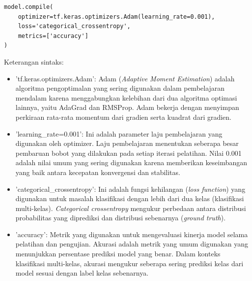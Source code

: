 \begin{lstlisting}[style=customc]
model.compile(
    optimizer=tf.keras.optimizers.Adam(learning_rate=0.001),
    loss='categorical_crossentropy',
    metrics=['accuracy']
)
\end{lstlisting}

Keterangan sintaks:
\begin{itemize}
    \item 'tf.keras.optimizers.Adam': Adam (\textit{Adaptive Moment Estimation}) adalah algoritma pengoptimalan yang sering digunakan dalam pembelajaran mendalam karena menggabungkan kelebihan dari dua algoritma optimasi lainnya, yaitu AdaGrad dan RMSProp. Adam bekerja dengan menyimpan perkiraan rata-rata momentum dari gradien serta kuadrat dari gradien.
    \item 'learning\_rate=0.001': Ini adalah parameter laju pembelajaran yang digunakan oleh optimizer. Laju pembelajaran menentukan seberapa besar pembaruan bobot yang dilakukan pada setiap iterasi pelatihan. Nilai 0.001 adalah nilai umum yang sering digunakan karena memberikan keseimbangan yang baik antara kecepatan konvergensi dan stabilitas.
    \item 'categorical\_crossentropy': Ini adalah fungsi kehilangan (\textit{loss function}) yang digunakan untuk masalah klasifikasi dengan lebih dari dua kelas (klasifikasi multi-kelas). \textit{Categorical crossentropy} mengukur perbedaan antara distribusi probabilitas yang diprediksi dan distribusi sebenarnya (\textit{ground truth}).
    \item 'accuracy': Metrik yang digunakan untuk mengevaluasi kinerja model selama pelatihan dan pengujian. Akurasi adalah metrik yang umum digunakan yang menunjukkan persentase prediksi model yang benar. Dalam konteks klasifikasi multi-kelas, akurasi mengukur seberapa sering prediksi kelas dari model sesuai dengan label kelas sebenarnya.
\end{itemize}

